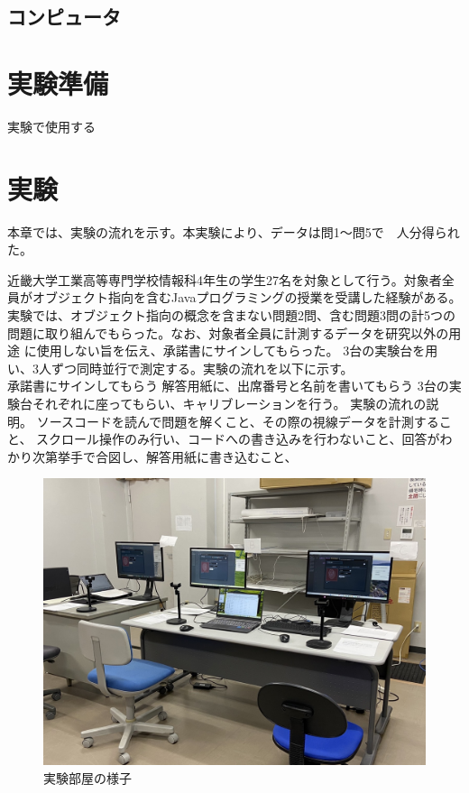 \documentclass[paper=a4paper,fontsize=10pt]{jlreq}
\begin{document}
    \subsection{コンピュータ}
      
  
  \section{実験準備}
    実験で使用する


  \section{実験}
    本章では、実験の流れを示す。本実験により、データは問1～問5で　人分得られた。

    近畿大学工業高等専門学校情報科4年生の学生27名を対象として行う。対象者全員がオブジェクト指向を含むJavaプログラミングの授業を受講した経験がある。\\
    実験では、オブジェクト指向の概念を含まない問題2問、含む問題3問の計5つの問題に取り組んでもらった。なお、対象者全員に計測するデータを研究以外の用途
    に使用しない旨を伝え、承諾書にサインしてもらった。
    3台の実験台を用い、3人ずつ同時並行で測定する。実験の流れを以下に示す。\\
    
    承諾書にサインしてもらう
    解答用紙に、出席番号と名前を書いてもらう
    3台の実験台それぞれに座ってもらい、キャリブレーションを行う。
    実験の流れの説明。
    ソースコードを読んで問題を解くこと、その際の視線データを計測すること、
    スクロール操作のみ行い、コードへの書き込みを行わないこと、回答がわかり次第挙手で合図し、解答用紙に書き込むこと、


    \begin{figure}[htbp]
      \centering
      \includegraphics[width=0.8\linewidth]{実験部屋.jpg}
      \caption{実験部屋の様子}
    \end{figure}
    \FloatBarrier
  
\end{document}
